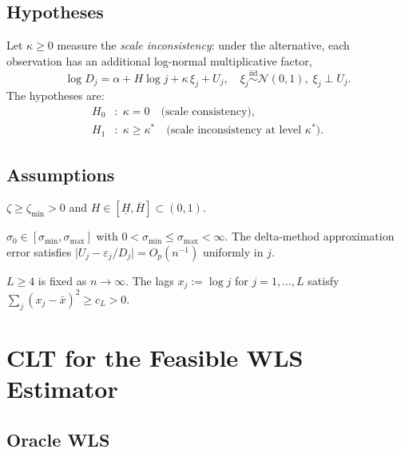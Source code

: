 \documentclass[10pt,a4paper,twocolumn]{article}
\newcommand{\iid}{\overset{\text{iid}}{\sim}}
\newcommand{\abs}[1]{\lvert#1\rvert}
\newcommand{\Dhj}{\widehat{D}_j}
\newcommand{\calN}{\mathcal{N}}
\begin{document}
\subsection{Hypotheses}

Let $\kappa \geq 0$ measure the \emph{scale inconsistency}: under the
alternative, each observation has an additional log-normal multiplicative
factor,
\[
    \log \Dhj = \alpha + H\log j + \kappa\,\xi_j + U_j,\quad
    \xi_j \iid \calN(0,1),\;\xi_j \perp U_j.
\]
The hypotheses are:
\begin{align*}
    H_0&:\; \kappa = 0 \quad\text{(scale consistency)},\\
    H_1&:\; \kappa \geq \kappa^* \quad\text{(scale inconsistency at level } \kappa^*\text{)}.
\end{align*}

\subsection{Assumptions}

\begin{assumption}
\label{ass:signal}
$\zeta \geq \zeta_{\min} > 0$ and $H \in [\underline{H}, \overline{H}]
\subset (0,1)$.
\end{assumption}

\begin{assumption}
\label{ass:sigma}
$\sigma_0 \in [\sigma_{\min}, \sigma_{\max}]$ with
$0 < \sigma_{\min} \leq \sigma_{\max} < \infty$.
The delta-method approximation error satisfies
$\abs{U_j - \varepsilon_j/D_j} = O_p(n^{-1})$ uniformly in $j$.
\end{assumption}

\begin{assumption}
\label{ass:lags}
$L \geq 4$ is fixed as $n \to \infty$.
The lags $x_j := \log j$ for $j = 1, \ldots, L$ satisfy
$\sum_j (x_j - \bar{x})^2 \geq c_L > 0$.
\end{assumption}

\section{CLT for the Feasible WLS Estimator}
\label{sec:clt}

\subsection{Oracle WLS}
\end{document}
